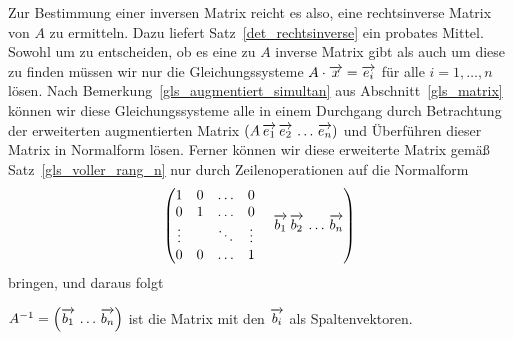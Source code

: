 Zur Bestimmung einer inversen Matrix reicht es also, eine rechtsinverse Matrix von $A$ zu ermitteln. Dazu liefert 
Satz~\ref{det_rechtsinverse} ein probates Mittel. Sowohl um zu entscheiden, ob es eine zu $A$ inverse Matrix gibt 
als auch um diese zu finden müssen wir nur die Gleichungssysteme $A \cdot 
\overrightarrow{x} = \overrightarrow{e_i}$ für alle $i = 1, \ldots, n$ lösen. Nach 
Bemerkung~\ref{gls_augmentiert_simultan} aus Abschnitt~\ref{gls_matrix}
können wir diese Gleichungssysteme alle in einem Durchgang durch 
Betrachtung der erweiterten augmentierten Matrix  $ \left( A \, \overrightarrow{e_1} \, \overrightarrow{e_2}
\, \ldots \, \overrightarrow{e_n}\right)$ und Überführen dieser Matrix in Normalform lösen. Ferner 
können wir diese erweiterte Matrix gemäß Satz~\ref{gls_voller_rang_n} nur durch Zeilenoperationen auf 
die Normalform
  	$$ \left( \begin{matrix} 1 & 0 & \ldots & 0 \\ 0 & 1 & \ldots & 0 \\ \vdots & & \ddots & \vdots \\
	0 & 0 & \ldots & 1 \end{matrix} \quad \, \, \overrightarrow{b_1} \, \overrightarrow{b_2} \, \ldots \, \overrightarrow{b_n}  \right) $$
bringen, und daraus folgt

\begin{korollar} $A^{-1} = \left( \overrightarrow{b_1} \, \ldots \, \overrightarrow{b_n} \right)$ ist die Matrix 
mit den $\overrightarrow{b_i}$ als Spaltenvektoren.
\end{korollar}

